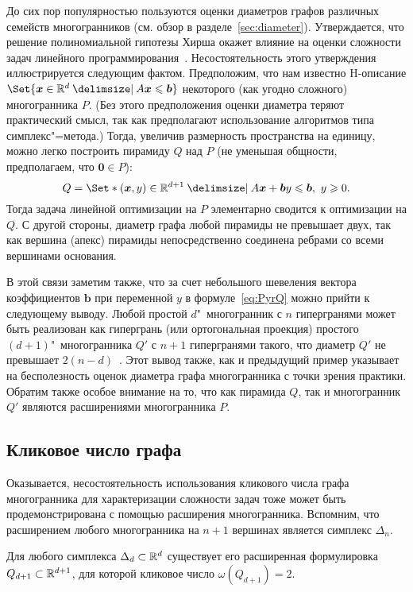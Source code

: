 До сих пор популярностью пользуются оценки диаметров графов различных семейств многогранников (см. обзор в разделе~\ref{sec:diameter}). Утверждается, что решение полиномиальной гипотезы Хирша окажет влияние на оценки сложности задач линейного программирования~\cite{Santos:2013}. Несостоятельность этого утверждения иллюстрируется следующим фактом. Предположим, что нам известно H-описание \(\Set{\bm{x} \in \R^d \given A\bm{x} \le \bm{b}}\) некоторого (как угодно сложного) многогранника $P$. (Без этого предположения оценки диаметра теряют практический смысл, так как предполагают использование алгоритмов типа симплекс"=метода.) Тогда, увеличив размерность пространства на единицу, можно легко построить пирамиду $Q$ над $P$ 
(не уменьшая общности, предполагаем, что $\bm{0} \in P$):%
\begin{equation}
\label{eq:PyrQ}
Q = \Set*{(\bm{x}, y) \in \R^{d+1} \given A\bm{x} + \bm{b} y \le \bm{b}, \ y \ge 0}.
\end{equation}
Тогда задача линейной оптимизации на $P$ элементарно сводится к оптимизации на $Q$.
С другой стороны, диаметр графа любой пирамиды не превышает двух, так как вершина (апекс) пирамиды непосредственно соединена ребрами со всеми вершинами основания.

В этой связи заметим также, что за счет небольшого шевеления вектора коэффициентов $\bm{b}$ при переменной $y$ в формуле~\eqref{eq:PyrQ} можно прийти к следующему выводу. Любой простой $d$"~многогранник с $n$ гипергранями может быть реализован как гипергрань (или ортогональная проекция) простого $(d+1)$"~многогранника $Q'$ с $n+1$ гипергранями такого, что диаметр $Q'$ не превышает $2(n - d)$~\cite{Lee:1991}.
Этот вывод также, как и предыдущий пример указывает на бесполезность оценок диаметра графа многогранника с точки зрения практики.
Обратим также особое внимание на то, что как пирамида $Q$, так и многогранник $Q'$ являются расширениями многогранника $P$.


\subsection{Кликовое число графа}
\label{subsec:CliqueCounterex}

Оказывается, несостоятельность использования кликового числа графа многогранника для характеризации сложности задач тоже может быть продемонстрирована с помощью расширения многогранника.
Вспомним, что расширением любого многогранника на $n+1$ вершинах является симплекс $\Delta_n$. 

\begin{prop}
	\label{th:simplex}
	Для любого симплекса $\Delta_d\subset\mathbb{R}^d$ существует 
	его расширенная формулировка $Q_{d+1}\subset\mathbb{R}^{d+1}$, для которой кликовое число $\omega(Q_{d+1}) = 2$.
\end{prop}


